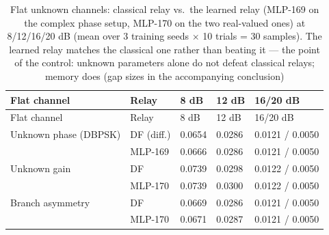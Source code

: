 \begin{longtable}[]{@{}lllll@{}}
\caption[Flat unknown channels]{Flat unknown channels: classical relay vs.\ the learned relay (MLP-169 on the complex phase setup, MLP-170 on the two real-valued ones) at 8/12/16/20 dB (mean over 3 training seeds $\times$ 10 trials = 30 samples). The learned relay matches the classical one rather than beating it --- the point of the control: unknown parameters alone do not defeat classical relays; memory does (gap sizes in the accompanying conclusion)}\label{tbl:tableE6flat}\tabularnewline
\toprule\noalign{}
Flat channel & Relay & 8 dB & 12 dB & 16/20 dB \\
\midrule\noalign{}
\endfirsthead
\toprule\noalign{}
Flat channel & Relay & 8 dB & 12 dB & 16/20 dB \\
\midrule\noalign{}
\endhead
\bottomrule\noalign{}
\endlastfoot
Unknown phase (DBPSK) & DF (diff.) & 0.0654 & 0.0286 & 0.0121 / 0.0050 \\
 & MLP-169 & 0.0666 & 0.0286 & 0.0121 / 0.0050 \\
Unknown gain & DF & 0.0739 & 0.0298 & 0.0122 / 0.0050 \\
 & MLP-170 & 0.0739 & 0.0300 & 0.0122 / 0.0050 \\
Branch asymmetry & DF & 0.0669 & 0.0286 & 0.0121 / 0.0050 \\
 & MLP-170 & 0.0671 & 0.0287 & 0.0121 / 0.0050 \\
\end{longtable}

